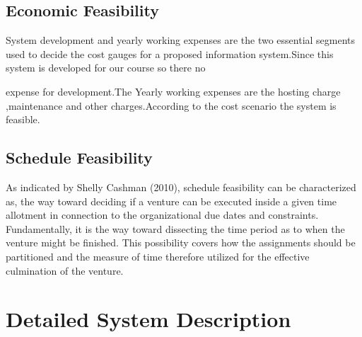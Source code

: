 \documentclass{article}
\begin{document}
\subsection{Economic Feasibility}

System development and yearly working expenses are the two essential segments used to decide the cost gauges for a proposed information system.Since this system is developed for our course so there no

expense for development.The Yearly working expenses are the hosting charge ,maintenance and other charges.According to the cost scenario the system is feasible.

\subsection{Schedule Feasibility}
As indicated by Shelly Cashman (2010), schedule feasibility can be characterized as, the way toward deciding if a venture can be executed inside a given time allotment in connection to the organizational due dates and constraints. Fundamentally, it is the way toward dissecting the time period  as to when the  venture  might  be  finished. This  possibility  covers  how  the assignments should be partitioned and the measure of time therefore utilized for the  effective culmination of the venture.

\newpage

\section{Detailed System Description}
\end{document}
